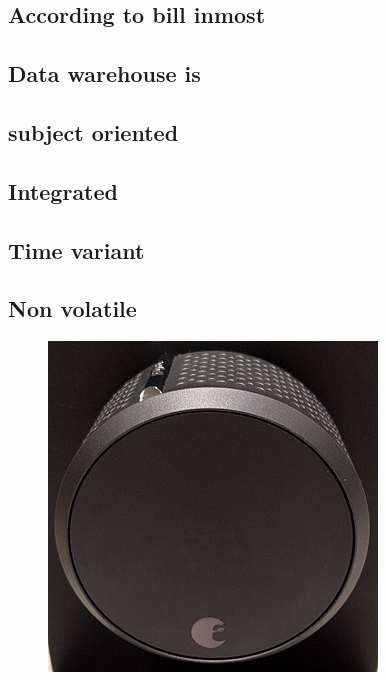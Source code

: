 \documentclass{article}
\begin{document}
\begin{flushleft}
 \tableofcontents
 \cleardoublepage
 
 \subsection{According to bill inmost} 
\subsection{Data warehouse is } 
\subsection{subject oriented} 
\subsection{Integrated} 
\subsection{Time variant}
\subsection{Non volatile} 
\end{flushleft}  

\newpage  


 \begin{figure}[hbtp]
 \centering
\includegraphics[scale=.15]{aah.jpg} 
 \end{figure}
 
\end{document}
